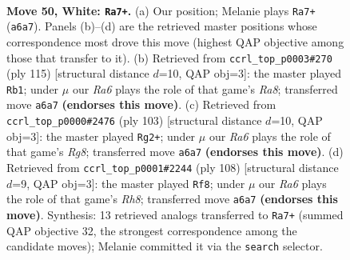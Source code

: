 \documentclass[11pt]{article}
\begin{document}
\clearpage

\begin{figure}[p]\centering
\begin{subfigure}{0.46\textwidth}\centering
\resizebox{\linewidth}{!}{%
\newchessgame
\chessboard[
  setfen={6r1/6k1/R7/P7/8/6K1/8/8 w - - 3 50},
  showmover=false,
  pgfstyle=straightmove, color=movearrow, markmove={a6-a7}
]}
\caption{}
\end{subfigure}\hfill
\begin{subfigure}{0.46\textwidth}\centering
\resizebox{\linewidth}{!}{%
\newchessgame
\chessboard[
  setfen={8/1KR5/8/1P1k4/8/8/8/r7 b - - 12 58},
  showmover=false,
  pgfstyle=straightmove, color=movearrow, markmove={a1-b1}
]}
\caption{}
\end{subfigure}
\\[4pt]
\begin{subfigure}{0.46\textwidth}\centering
\resizebox{\linewidth}{!}{%
\newchessgame
\chessboard[
  setfen={8/8/7p/3k3P/8/8/RK6/6r1 b - - 8 52},
  showmover=false,
  pgfstyle=straightmove, color=movearrow, markmove={g1-g2}
]}
\caption{}
\end{subfigure}\hfill
\begin{subfigure}{0.46\textwidth}\centering
\resizebox{\linewidth}{!}{%
\newchessgame
\chessboard[
  setfen={7R/1kr5/8/p7/4K3/8/P7/8 w - - 5 55},
  showmover=false,
  pgfstyle=straightmove, color=movearrow, markmove={h8-f8}
]}
\caption{}
\end{subfigure}
\caption{\textbf{Move 50, White: \texttt{Ra7+}.} (a) Our position; Melanie plays \texttt{Ra7+} (\texttt{a6a7}). Panels (b)--(d) are the retrieved master positions whose correspondence most drove this move (highest QAP objective among those that transfer to it). (b) Retrieved from \texttt{ccrl\_top\_p0003\#270} (ply 115) [structural distance $d$=10, QAP obj=3]: the master played \texttt{Rb1}; under $\mu$ our \emph{Ra6} plays the role of that game's \emph{Ra8}; transferred move \texttt{a6a7} \textbf{(endorses this move)}. (c) Retrieved from \texttt{ccrl\_top\_p0000\#2476} (ply 103) [structural distance $d$=10, QAP obj=3]: the master played \texttt{Rg2+}; under $\mu$ our \emph{Ra6} plays the role of that game's \emph{Rg8}; transferred move \texttt{a6a7} \textbf{(endorses this move)}. (d) Retrieved from \texttt{ccrl\_top\_p0001\#2244} (ply 108) [structural distance $d$=9, QAP obj=3]: the master played \texttt{Rf8}; under $\mu$ our \emph{Ra6} plays the role of that game's \emph{Rh8}; transferred move \texttt{a6a7} \textbf{(endorses this move)}. Synthesis: 13 retrieved analogs transferred to \texttt{Ra7+} (summed QAP objective 32, the strongest correspondence among the candidate moves); Melanie committed it via the \texttt{search} selector.}
\label{fig:thought-m98}
\end{figure}
\end{document}
